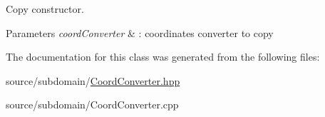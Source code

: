 Copy constructor. 


\begin{DoxyParams}{Parameters}
{\em coord\+Converter} & \+: coordinates converter to copy \\
\hline
\end{DoxyParams}


The documentation for this class was generated from the following files\+:\begin{DoxyCompactItemize}
\item 
source/subdomain/\mbox{\hyperlink{CoordConverter_8hpp}{Coord\+Converter.\+hpp}}\item 
source/subdomain/Coord\+Converter.\+cpp\end{DoxyCompactItemize}
